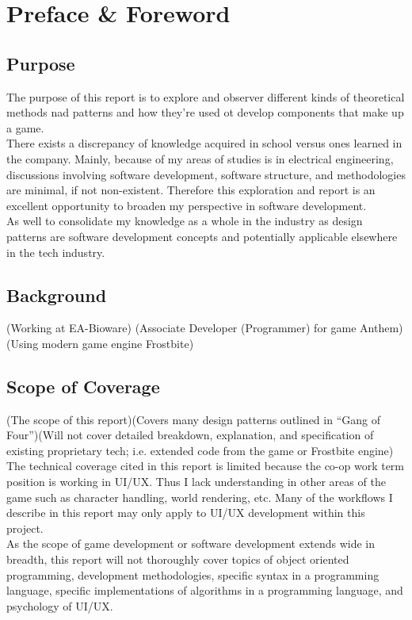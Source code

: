 
\section*{Preface \& Foreword}

\subsection*{Purpose}

The purpose of this report is to explore and observer different kinds of theoretical methods nad patterns and how they're used ot develop components that make up a game.\bs
\\
There exists a discrepancy of knowledge acquired in school versus ones learned in the company. Mainly, because of my areas of studies is in electrical engineering, discussions involving software development, software structure, and methodologies are minimal, if not non-existent. Therefore this exploration and report is an excellent opportunity to broaden my perspective in software development.\bs
\\
As well to consolidate my knowledge as a whole in the industry as design patterns are software development concepts and potentially applicable elsewhere in the tech industry.

\subsection*{Background}

(Working at EA-Bioware)
(Associate Developer (Programmer) for game Anthem)
(Using modern game engine Frostbite)

\subsection*{Scope of Coverage}

(The scope of this report)(Covers many design patterns outlined in ``Gang of Four'')(Will not cover detailed breakdown, explanation, and specification of existing proprietary tech; i.e. extended code from the game or Frostbite engine)\bs
\\
The technical coverage cited in this report is limited because the co-op work term position is working in UI/UX. Thus I lack understanding in other areas of the game such as character handling, world rendering, etc. Many of the workflows I describe in this report may only apply to UI/UX development within this project.\bs
\\
As the scope of game development or software development extends wide in breadth, this report will not thoroughly cover topics of object oriented programming, development methodologies, specific syntax in a programming language, specific implementations of algorithms in a programming language, and psychology of UI/UX.

